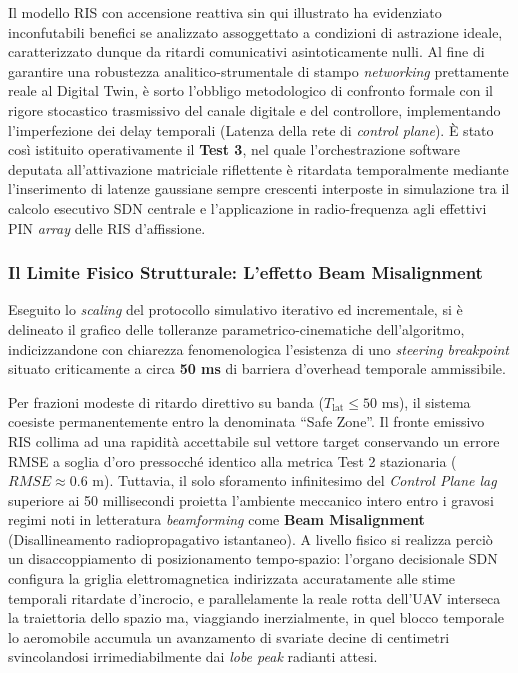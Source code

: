 \documentclass[twoside]{article}
\begin{document}
Il modello RIS con accensione reattiva sin qui illustrato ha evidenziato inconfutabili benefici se analizzato assoggettato a condizioni di astrazione ideale, caratterizzato dunque da ritardi comunicativi asintoticamente nulli. Al fine di garantire una robustezza analitico-strumentale di stampo \textit{networking} prettamente reale al Digital Twin, è sorto l'obbligo metodologico di confronto formale con il rigore stocastico trasmissivo del canale digitale e del controllore, implementando l'imperfezione dei delay temporali (Latenza della rete di \textit{control plane}). È stato così istituito operativamente il \textbf{Test 3}, nel quale l'orchestrazione software deputata all'attivazione matriciale riflettente è ritardata temporalmente mediante l'inserimento di latenze gaussiane sempre crescenti interposte in simulazione tra il calcolo esecutivo SDN centrale e l'applicazione in radio-frequenza agli effettivi PIN \textit{array} delle RIS d'affissione.

\subsubsection{Il Limite Fisico Strutturale: L'effetto Beam Misalignment}
Eseguito lo \textit{scaling} del protocollo simulativo iterativo ed incrementale, si è delineato il grafico delle tolleranze parametrico-cinematiche dell'algoritmo, indicizzandone con chiarezza fenomenologica l'esistenza di uno \textit{steering breakpoint} situato criticamente a circa \textbf{50 ms} di barriera d'overhead temporale ammissibile.

Per frazioni modeste di ritardo direttivo su banda ($T_{\text{lat}} \leq 50 \text{ ms}$), il sistema coesiste permanentemente entro la denominata ``Safe Zone''. Il fronte emissivo RIS collima ad una rapidità accettabile sul vettore target conservando un errore RMSE a soglia d'oro pressocché identico alla metrica Test 2 stazionaria ($RMSE \approx 0.6\text{ m}$).
Tuttavia, il solo sforamento infinitesimo del \textit{Control Plane lag} superiore ai 50 millisecondi proietta l'ambiente meccanico intero entro i gravosi regimi noti in letteratura \textit{beamforming} come \textbf{Beam Misalignment} (Disallineamento radiopropagativo istantaneo).
A livello fisico si realizza perciò un disaccoppiamento di posizionamento tempo-spazio: l'organo decisionale SDN configura la griglia elettromagnetica indirizzata accuratamente alle stime temporali ritardate d'incrocio, e parallelamente la reale rotta dell'UAV interseca la traiettoria dello spazio ma, viaggiando inerzialmente, in quel blocco temporale lo aeromobile accumula un avanzamento di svariate decine di centimetri svincolandosi irrimediabilmente dai \textit{lobe peak} radianti attesi.
\end{document}
